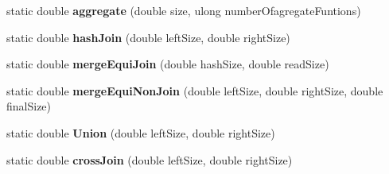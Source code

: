 \begin{DoxyCompactItemize}
\item 
\hypertarget{class_time_complexity_acd0a6aaac8bc9b92dcc2432e1ab1d0ec}{static double {\bfseries aggregate} (double size, ulong number\+Ofagregate\+Funtions)}\label{class_time_complexity_acd0a6aaac8bc9b92dcc2432e1ab1d0ec}

\item 
\hypertarget{class_time_complexity_a50f40bc288b73787d046ce15ebefe28e}{static double {\bfseries hash\+Join} (double left\+Size, double right\+Size)}\label{class_time_complexity_a50f40bc288b73787d046ce15ebefe28e}

\item 
\hypertarget{class_time_complexity_a53a7093969abe4962759e3c648981883}{static double {\bfseries merge\+Equi\+Join} (double hash\+Size, double read\+Size)}\label{class_time_complexity_a53a7093969abe4962759e3c648981883}

\item 
\hypertarget{class_time_complexity_a450314407ba001db82fbdea4f01c1cfc}{static double {\bfseries merge\+Equi\+Non\+Join} (double left\+Size, double right\+Size, double final\+Size)}\label{class_time_complexity_a450314407ba001db82fbdea4f01c1cfc}

\item 
\hypertarget{class_time_complexity_a72b8fafa9b22122ef78b68deb09678e1}{static double {\bfseries Union} (double left\+Size, double right\+Size)}\label{class_time_complexity_a72b8fafa9b22122ef78b68deb09678e1}

\item 
\hypertarget{class_time_complexity_a71665e9569694b0fa375e886d440b959}{static double {\bfseries cross\+Join} (double left\+Size, double right\+Size)}\label{class_time_complexity_a71665e9569694b0fa375e886d440b959}

\end{DoxyCompactItemize}
